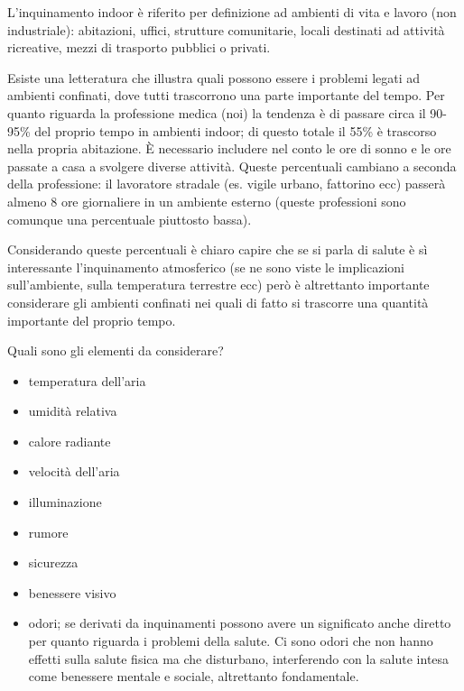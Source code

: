 L'inquinamento indoor è riferito per definizione ad ambienti di vita e
lavoro (non industriale): abitazioni, uffici, strutture comunitarie,
locali destinati ad attività ricreative, mezzi di trasporto pubblici o
privati.

Esiste una letteratura che illustra quali possono essere i problemi
legati ad ambienti confinati, dove tutti trascorrono una parte
importante del tempo. Per quanto riguarda la professione medica (noi) la
tendenza è di passare circa il 90-95\% del proprio tempo in ambienti
indoor; di questo totale il 55\% è trascorso nella propria abitazione. È
necessario includere nel conto le ore di sonno e le ore passate a casa a
svolgere diverse attività. Queste percentuali cambiano a seconda della
professione: il lavoratore stradale (es. vigile urbano, fattorino ecc)
passerà almeno 8 ore giornaliere in un ambiente esterno (queste
professioni sono comunque una percentuale piuttosto bassa).

Considerando queste percentuali è chiaro capire che se si parla di
salute è sì interessante l'inquinamento atmosferico (se ne sono viste le
implicazioni sull'ambiente, sulla temperatura terrestre ecc) però è
altrettanto importante considerare gli ambienti confinati nei quali di
fatto si trascorre una quantità importante del proprio tempo.

Quali sono gli elementi da considerare?

\begin{itemize}
\item
   
  temperatura dell'aria
   
\item
   
  umidità relativa
   
\item
   
  calore radiante
   
\item
   
  velocità dell'aria
   
\item
   
  illuminazione
   
\item
   
  rumore
   
\item
   
  sicurezza
   
\item
   
  benessere visivo
   
\item
   
  odori; se derivati da inquinamenti possono avere un significato anche
  diretto per quanto riguarda i problemi della salute. Ci sono odori che
  non hanno effetti sulla salute fisica ma che disturbano, interferendo
  con la salute intesa come benessere mentale e sociale, altrettanto
  fondamentale.
   
\end{itemize}

